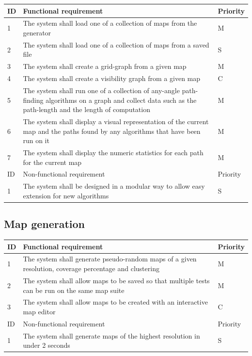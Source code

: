 \documentclass[12pt,twoside,notitlepage]{report}
\begin{document}
\begin{center}
    \begin{tabular}{ l | p{10cm} | l}
    ID & Functional requirement & Priority  \\ \hline
    1 & The system shall load one of a collection of maps from the generator & M \\ \hline
    2 & The system shall load one of a collection of maps from a saved file & S \\ \hline
    3 & The system shall create a grid-graph from a given map & M \\ \hline
    4 & The system shall create a visibility graph from a given map & C \\ \hline
    5 & The system shall run one of a collection of any-angle path-finding algorithms on a graph and collect data such as the path-length and the length of computation & M \\ \hline
    6 & The system shall display a visual representation of the current map and the paths found by any algorithms that have been run on it & M \\ \hline
    7 & The system shall display the numeric statistics for each path for the current map & M \\ \hline
     \hline 
    ID & Non-functional requirement & Priority  \\ \hline
    1 & The system shall be designed in a modular way to allow easy extension for new algorithms & S \\
    \end{tabular}
\end{center}

\subsection{Map generation}

\begin{center}
    \begin{tabular}{ l | p{10cm} | l }
    ID & Functional requirement & Priority  \\ \hline
    1 & The system shall generate pseudo-random maps of a given resolution, coverage percentage and clustering & M \\ \hline
    2 & The system shall allow maps to be saved so that multiple tests can be run on the same map suite & M \\ \hline
     3 & The system shall allow maps to be created with an interactive map editor & C\\ \hline
          \hline 
    ID & Non-functional requirement & Priority  \\ \hline
    1 & The system shall generate maps of the highest resolution in under 2 seconds & S \\
    \end{tabular}
\end{center}
	
\end{document}
